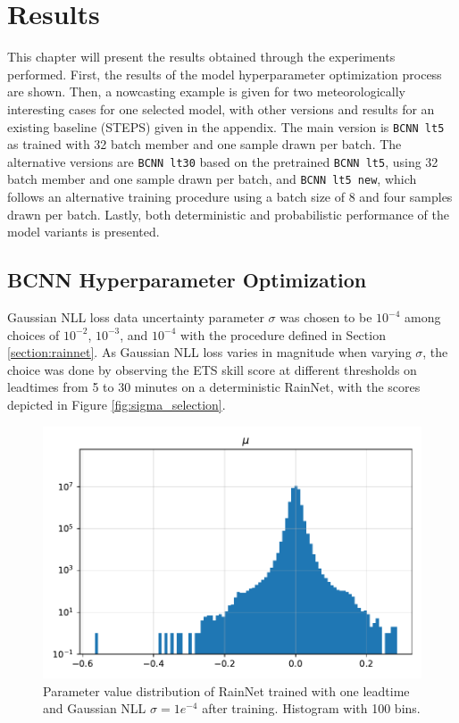 \chapter{Results}
\label{chapter:results}

This chapter will present the results obtained through the experiments performed. First, the results of the model hyperparameter optimization process are shown. Then, a nowcasting example is given for two meteorologically interesting cases for one selected model, with other versions and results for an existing baseline (STEPS) given in the appendix. The main version is \texttt{BCNN lt5} as trained with 32 batch member and one sample drawn per batch. The alternative versions are \texttt{BCNN lt30} based on the pretrained \texttt{BCNN lt5}, using 32 batch member and one sample drawn per batch, and \texttt{BCNN lt5 new}, which follows an alternative training procedure using a batch size of 8 and four samples drawn per batch. Lastly, both deterministic and probabilistic performance of the model variants is presented. 

\section{BCNN Hyperparameter Optimization}

Gaussian NLL loss data uncertainty parameter $\sigma$ was chosen to be $10^{-4}$ among choices of $10^{-2}$, $10^{-3}$, and $10^{-4}$ with the procedure defined in Section \ref{section:rainnet}. As Gaussian NLL loss varies in magnitude when varying $\sigma$, the choice was done by observing the ETS skill score at different thresholds on leadtimes from 5 to 30 minutes on a deterministic RainNet, with the scores depicted in Figure \ref{fig:sigma_selection}. %

\begin{figure}[H]
	\centering
	\includegraphics[width=0.6\linewidth]{images/weight/bcnn_rn_t1_lt5}
	\caption{Parameter value distribution of RainNet trained with one leadtime and Gaussian NLL $\sigma = 1e^{-4}$ after training. Histogram with 100 bins.}
	\label{fig:rn-weight}
\end{figure}

